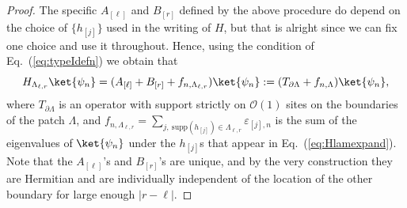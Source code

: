 \documentclass[prx,letterpaper,aps,superscriptaddress,floatfix,twocolumn,nofootinbib]{revtex4-2}
\theoremstyle{definition}
\newcommand{\defn}{:=}
\begin{document}
\begin{proof}
%
The specific $A_{[\ell]}$ and $B_{[r]}$ defined by the above procedure do depend on the choice of $\{ h_{[j]} \}$ used in the writing of $H$, but that is alright since we can fix one choice and use it throughout.
%
Hence, using the condition of Eq.~(\ref{eq:typeIdefn}) we obtain that 
\begin{equation}
    H_{\Lambda_{\ell,r}}\ket{\psi_n} = (A_{[\ell]} + B_{[r]} + f_{n,\Lambda_{\ell,r}})\ket{\psi_n} \defn (T_{\partial \Lambda}+ f_{n, \Lambda} )\ket{\psi_n}, 
\label{eq:Hlambound}
\end{equation}
where $T_{\partial \Lambda}$ is an operator with support strictly on $\mathcal{O}(1)$ sites on the boundaries of the patch $\Lambda$, and $f_{n,\Lambda_{\ell,r}} =\sum_{j,~\text{supp}(h_{[j]}) \in \Lambda_{\ell,r}}{\varepsilon_{[j],n}}$ is the sum of the eigenvalues of $\ket{\psi_n}$ under the $h_{[j]}$s that appear in Eq.~(\ref{eq:Hlamexpand}).
%
Note that the $A_{[\ell]}$'s and $B_{[r]}$'s are unique, and by the very construction they are Hermitian and are individually independent of the location of the other boundary for large enough $|r-\ell|$.
%


\end{proof}
\end{document}
